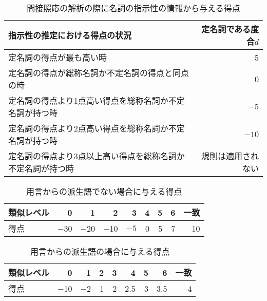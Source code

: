 {\begin{enumerate}
  \begin{table}[t]
    \begin{center}
      \caption{間接照応の解析の際に名詞の指示性の情報から与える得点}
    \label{tab:teimeishidenai_doai2}
  \begin{tabular}[h]{|l|r|}\hline
  指示性の推定における得点の状況                           & 定名詞である度合$d$\\\hline
  定名詞の得点が最も高い時 & 5\\
  定名詞の得点が総称名詞か不定名詞の得点と同点の時 & 0\\
  定名詞の得点より1点高い得点を総称名詞か不定名詞が持つ時  & $-5$\\
  定名詞の得点より2点高い得点を総称名詞か不定名詞が持つ時  & $-10$\\
  定名詞の得点より3点以上高い得点を総称名詞か不定名詞が持つ時 &  規則は適用されない \\\hline
  \end{tabular}
    \end{center}
\bigskip
  \end{table}

\begin{table}[t]
  \leavevmode
    \caption{用言からの派生語でない場合に与える得点}
    \label{tab:ruijido_hisahen}

  \begin{center}
\begin{tabular}[c]{|l|r|r|r|r|r|r|r|r|}\hline
類似レベル & 0   & 1  & 2  & 3 & 4 & 5 & 6 & 一致\\\hline
得点   & $-$30 & $-$20 & $-$10 & $-5$ & 0 & 5 & 7 & 10\\\hline
\end{tabular}
\end{center}
\end{table}


\begin{table}[t]
 \vspace*{-1.4mm}
  \leavevmode
    \caption{用言からの派生語の場合に与える得点}
    \label{tab:ruijido_sahen}

  \begin{center}
\begin{tabular}[c]{|l|r|r|r|r|r|r|r|r|}\hline
類似レベル & 0 & 1 & 2 & 3 & 4 & 5 & 6 & 一致\\\hline
得点   & $-$10 & $-$2 & 1 & 2 & 2.5& 3 & 3.5 & 4\\\hline
\end{tabular}
\end{center}
  \vspace*{-1.3mm}
\end{table}


\end{enumerate}}
